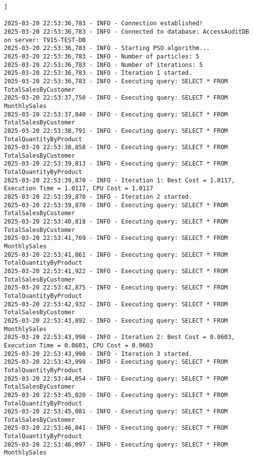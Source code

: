 

\begin{lstlisting}[style=pythonstyle, caption={Output from python code }, label={lst:pso_query_optimization}]]

2025-03-20 22:53:36,783 - INFO - Connection established!
2025-03-20 22:53:36,783 - INFO - Connected to database: AccessAuditDB on server: T915-TEST-DB
2025-03-20 22:53:36,783 - INFO - Starting PSO algorithm...
2025-03-20 22:53:36,783 - INFO - Number of particles: 5
2025-03-20 22:53:36,783 - INFO - Number of iterations: 5
2025-03-20 22:53:36,783 - INFO - Iteration 1 started.
2025-03-20 22:53:36,783 - INFO - Executing query: SELECT * FROM TotalSalesByCustomer
2025-03-20 22:53:37,750 - INFO - Executing query: SELECT * FROM MonthlySales
2025-03-20 22:53:37,840 - INFO - Executing query: SELECT * FROM TotalSalesByCustomer
2025-03-20 22:53:38,791 - INFO - Executing query: SELECT * FROM TotalQuantityByProduct
2025-03-20 22:53:38,858 - INFO - Executing query: SELECT * FROM TotalSalesByCustomer
2025-03-20 22:53:39,813 - INFO - Executing query: SELECT * FROM TotalQuantityByProduct
2025-03-20 22:53:39,870 - INFO - Iteration 1: Best Cost = 1.0117, Execution Time = 1.0117, CPU Cost = 1.0117
2025-03-20 22:53:39,870 - INFO - Iteration 2 started.
2025-03-20 22:53:39,870 - INFO - Executing query: SELECT * FROM TotalSalesByCustomer
2025-03-20 22:53:40,818 - INFO - Executing query: SELECT * FROM TotalSalesByCustomer
2025-03-20 22:53:41,769 - INFO - Executing query: SELECT * FROM MonthlySales
2025-03-20 22:53:41,861 - INFO - Executing query: SELECT * FROM TotalQuantityByProduct
2025-03-20 22:53:41,922 - INFO - Executing query: SELECT * FROM TotalSalesByCustomer
2025-03-20 22:53:42,875 - INFO - Executing query: SELECT * FROM TotalQuantityByProduct
2025-03-20 22:53:42,932 - INFO - Executing query: SELECT * FROM TotalSalesByCustomer
2025-03-20 22:53:43,892 - INFO - Executing query: SELECT * FROM MonthlySales
2025-03-20 22:53:43,998 - INFO - Iteration 2: Best Cost = 0.0603, Execution Time = 0.0603, CPU Cost = 0.0603
2025-03-20 22:53:43,998 - INFO - Iteration 3 started.
2025-03-20 22:53:43,998 - INFO - Executing query: SELECT * FROM TotalQuantityByProduct
2025-03-20 22:53:44,054 - INFO - Executing query: SELECT * FROM TotalSalesByCustomer
2025-03-20 22:53:45,020 - INFO - Executing query: SELECT * FROM TotalQuantityByProduct
2025-03-20 22:53:45,081 - INFO - Executing query: SELECT * FROM TotalSalesByCustomer
2025-03-20 22:53:46,041 - INFO - Executing query: SELECT * FROM TotalQuantityByProduct
2025-03-20 22:53:46,097 - INFO - Executing query: SELECT * FROM MonthlySales

\end{lstlisting}
